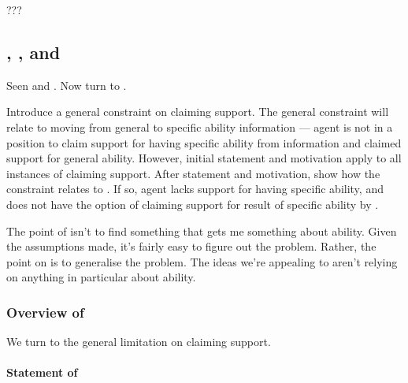 \begin{note}[Summarising]
  ???
\end{note}

\subsection{\nI{}, \gsi{}, and }
\label{sec:second-conditional}

\begin{note}
  Seen \ESU{} and \adB{}.
  Now turn to \adA{}.
\end{note}

\begin{note}
  Introduce a general constraint on claiming support.
  The general constraint will relate to moving from general to specific ability information --- agent is not in a position to claim support for having specific ability from information and claimed support for general ability.
  However, initial statement and motivation apply to all instances of claiming support.
  After statement and motivation, show how the constraint relates to \adA{}.
  If so, agent lacks support for having specific ability, and does not have the option of claiming support for result of specific ability by \adA{}.
\end{note}

\begin{note}
  \color{red}
  \large

  The point of \nI{} isn't to find something that gets me something about ability.
  Given the assumptions made, it's fairly easy to figure out the problem.
  Rather, the point on \nI{} is to generalise the problem.
  The ideas we're appealing to aren't relying on anything in particular about ability.
\end{note}

\subsubsection{Overview of \nI{}}
\label{sec:ni-1}

\begin{note}
  We turn to the general limitation on claiming support.
\end{note}

\paragraph{Statement of \nI{}}

